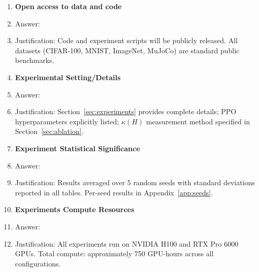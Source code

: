 \documentclass{article}
\begin{document}
\begin{enumerate}
\item {\bf Open access to data and code}
    \item[] Answer: \answerYes{}
    \item[] Justification: Code and experiment scripts will be publicly released. All datasets (CIFAR-100, MNIST, ImageNet, MuJoCo) are standard public benchmarks.

\item {\bf Experimental Setting/Details}
    \item[] Answer: \answerYes{}
    \item[] Justification: Section~\ref{sec:experiments} provides complete details; PPO hyperparameters explicitly listed; $\kappa(H)$ measurement method specified in Section~\ref{sec:ablation}.

\item {\bf Experiment Statistical Significance}
    \item[] Answer: \answerYes{}
    \item[] Justification: Results averaged over 5 random seeds with standard deviations reported in all tables. Per-seed results in Appendix~\ref{app:seeds}.

\item {\bf Experiments Compute Resources}
    \item[] Answer: \answerYes{}
    \item[] Justification: All experiments run on NVIDIA H100 and RTX Pro 6000 GPUs. Total compute: approximately 750 GPU-hours across all configurations.

\end{enumerate}
\end{document}
